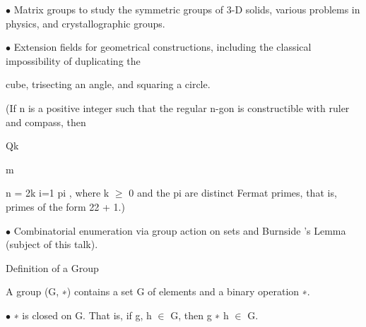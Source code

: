 \documentclass[a4paper,portrait,12pt]{article}
\begin{document}
\begin{flushleft}
$\bullet$ Matrix groups to study the symmetric groups of 3-D solids, various problems in physics, and crystallographic groups.
\end{flushleft}





\begin{flushleft}
$\bullet$ Extension fields for geometrical constructions, including the classical impossibility of duplicating the
\end{flushleft}


\begin{flushleft}
cube, trisecting an angle, and squaring a circle.
\end{flushleft}





\begin{flushleft}
(If n is a positive integer such that the regular n-gon is constructible with ruler and compass, then
\end{flushleft}


\begin{flushleft}
Qk
\end{flushleft}


\begin{flushleft}
m
\end{flushleft}


\begin{flushleft}
n = 2k i=1 pi , where k $\geq$ 0 and the pi are distinct Fermat primes, that is, primes of the form 22 + 1.)
\end{flushleft}


\begin{flushleft}
$\bullet$ Combinatorial enumeration via group action on sets and Burnside 's Lemma (subject of this talk).
\end{flushleft}





\begin{flushleft}
Definition of a Group
\end{flushleft}


\begin{flushleft}
A group (G, ∗) contains a set G of elements and a binary operation ∗.
\end{flushleft}


\begin{flushleft}
$\bullet$ ∗ is closed on G. That is, if g, h $\in$ G, then g ∗ h $\in$ G.
\end{flushleft}
\end{document}
